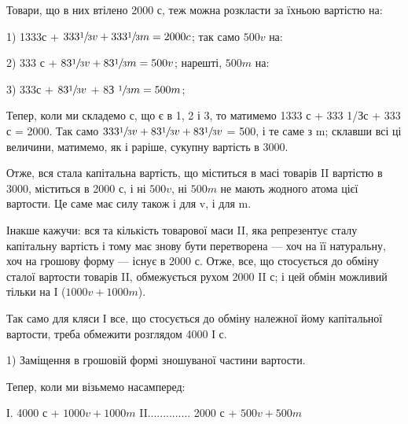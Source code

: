 Товари, що в них втілено 2000 с, теж можна розкласти за їхньою
вартістю на:

1) 1333с + $333\sfrac{1}{3} v + 333\sfrac{1}{3}m = 2000c$; так само $500 v$ на:

2) 333 с + $83\sfrac{1}{3} v + 83\sfrac{1}{3} m = 500 v$; нарешті, $500 m$ на:

3) 333с + $83\sfrac{1}{3} v$ + 8З $\sfrac{1}{3} m = 500 m$;

Тепер, коли ми складемо с, що є в 1, 2 і 3, то матимемо 1333 с
+ 333 1/Зс + 333 с = 2000. Так само $333\sfrac{1}{3}v + 83\sfrac{1}{3}v + 83\sfrac{1}{3}v$
= 500, і те саме з m; склавши всі ці величини, матимемо, як і раріше,
сукупну вартість в 3000.

Отже, вся стала капітальна вартість, що міститься в масі товарів II
вартістю в 3000, міститься в 2000 с, і ні $500 v$, ні $500 m$ не мають
жодного атома цієї вартости. Це саме має силу також і для v, і для m.

Інакше кажучи: вся та кількість товарової маси II, яка репрезентує
сталу капітальну вартість і тому має знову бути перетворена — хоч
на її натуральну, хоч на грошову форму — існує в 2000 с. Отже, все, що
стосується до обміну сталої вартости товарів II, обмежується рухом 2000
II с; і цей обмін можливий тільки на І ($1000 v + 1000 m$).

Так само для кляси І все, що стосується до обміну належної йому
капітальної вартости, треба обмежити розглядом 4000 І с.

1) Заміщення в грошовій формі зношуваної частини вартости.

Тепер, коли ми візьмемо насамперед:

І. 4000 с + $1000 v + 1000 m$
II..............  2000 с + $500 v + 500 m$

